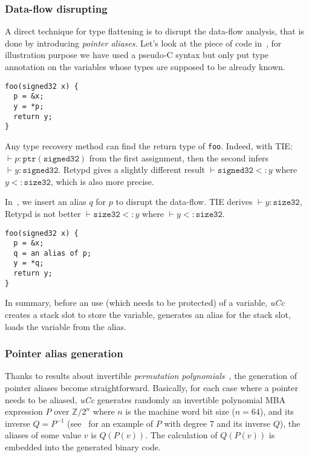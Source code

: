 \documentclass[compsoc,conference,a4paper,10pt,times]{IEEEtran}
\begin{document}
\subsubsection*{Data-flow disrupting}
A direct technique for type flattening is to disrupt the data-flow analysis, that is done by
introducing \emph{pointer aliases}. Let's look at the
piece of code in~, for illustration purpose we have used a pseudo-C syntax but only
put type annotation on the variables whose types are supposed to be already known.
\begin{lstlisting}[style={c},caption={Direct data movement},label={lst:directmov}]
foo(signed32 x) {
  p = &x;
  y = *p;
  return y;
}
\end{lstlisting}
Any type recovery method can find the return type of \texttt{foo}. Indeed,
with TIE: $\vdash p \colon \mathtt{ptr}(\mathtt{signed32})$ from the first assignment,
then the second infers $\vdash y \colon \mathtt{signed32}$. Retypd gives a slightly
different result $\vdash \mathtt{signed32} <\colon y$
where $y <\colon \mathtt{size32}$, which is also more precise.

In~, we insert an alias $q$ for $p$ to disrupt the data-flow.
TIE derives $\vdash y \colon \mathtt{size32}$, Retypd is not better
$\vdash \mathtt{size32} <\colon y$ where $\vdash y <\colon \mathtt{size32}$.
\begin{lstlisting}[style={c},caption={Data movement with pointer alias},label={lst:obfmov}]
foo(signed32 x) {
  p = &x;
  q = an alias of p;
  y = *q;
  return y;
}
\end{lstlisting}
In summary, before an use (which needs to be protected) of a
variable, \emph{uCc} \raisebox{.5pt}{\textcircled{\raisebox{-.9pt} {1}}} creates a stack slot to store the variable,
\raisebox{.5pt}{\textcircled{\raisebox{-.9pt} {2}}} generates an alias for the stack slot,
\raisebox{.5pt}{\textcircled{\raisebox{-.9pt} {3}}} loads the variable from the alias.

\subsubsection*{Pointer alias generation}
Thanks to results about invertible \emph{permutation polynomials}~\cite{zhou_information_2007}, the
generation of pointer aliases become straightforward. Basically, for each case where a pointer needs to
be aliased, \emph{uCc} generates randomly an invertible polynomial MBA expression $P$ over
$\mathbb{Z}/2^n$ where $n$ is the machine word bit size ($n = 64$), and its inverse $Q = P^{-1}$
(see~ for an example of $P$ with degree 7 and its inverse $Q$),
the aliases of some value $v$ is $Q(P(v))$. The calculation of $Q(P(v))$ is embedded into the generated
binary code.
\end{document}

